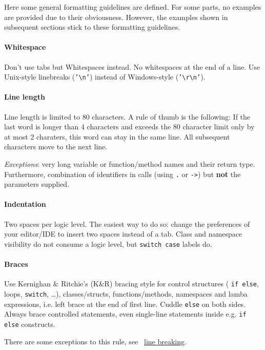 \documentclass[onecolumn, a4paper, 11pt]{article}%
\begin{document}
Here some general formatting guidelines are defined. For some parts, no examples
are provided due to their obviousness. However, the examples shown in subsequent
sections stick to these formatting guidelines.

\paragraph{\label{par:whitespace}Whitespace}
Don't use tabs but Whitespaces instead. No whitespaces at the end of a line.
Use Unix-style linebreaks (\texttt{'\textbackslash n'}) instead of Windows-style
(\texttt{'\textbackslash r\textbackslash n'}).

\paragraph{\label{par:line-length}Line length}
Line length is limited to 80 characters. A rule of thumb is the following:
If the last word is longer than 4 characters and exceeds the 80 character limit
only by at most 2 charaters, this word can stay in the same line. All subsequent
characters move to the next line.

\emph{Exceptions}: very long variable or function/method names and their return
type. Furthermore, combination of identifiers in calls (using \texttt{.} or
\texttt{->}) but {\bfseries not} the parameters supplied.

\paragraph{\label{par:indentation}Indentation}
Two spaces per logic level. The easiest way to do so: change the preferences of
your editor/IDE to insert two spaces instead of a tab.
Class and namespace visibility do not consume a logic level, but
\texttt{switch case} labels do.

\paragraph{\label{par:braces}Braces}
Use Kernighan \& Ritchie's (K\&R) bracing style for control structures (%
\texttt{if else}, loops, \texttt{switch}, \ldots), classes/structs,
functions/methods, namespaces and lamba expressions, i.e. left brace at the end
of first line. Cuddle \texttt{else} on both sides. Always brace controlled
statements, even single-line statements inside e.g. \texttt{if else} constructs.

There are some exceptions to this rule, see%
~\hyperref[par:line-breaking]{line breaking}.
\end{document}
